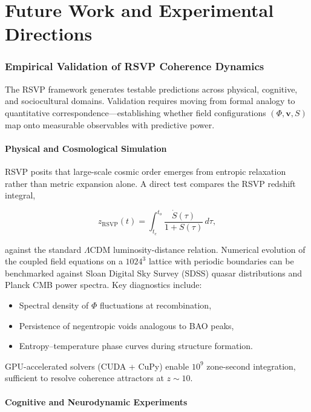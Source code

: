 \documentclass[12pt,a4paper]{article}
\begin{document}
\clearpage
\part*{Future Work and Experimental Directions}

\section{Empirical Validation of RSVP Coherence Dynamics}

The RSVP framework generates testable predictions across physical, cognitive, and sociocultural domains. Validation requires moving from formal analogy to quantitative correspondence—establishing whether field configurations $(\Phi, \bm{v}, S)$ map onto measurable observables with predictive power.

\subsection{Physical and Cosmological Simulation}

RSVP posits that large-scale cosmic order emerges from entropic relaxation rather than metric expansion alone. A direct test compares the RSVP redshift integral,

\begin{equation}
z_{\text{RSVP}}(t) = \int_{t_e}^{t_o} \frac{\dot{S}(\tau)}{1 + S(\tau)} \, d\tau,
\end{equation}

against the standard $\Lambda$CDM luminosity-distance relation. Numerical evolution of the coupled field equations on a $1024^3$ lattice with periodic boundaries can be benchmarked against Sloan Digital Sky Survey (SDSS) quasar distributions and Planck CMB power spectra. Key diagnostics include:
\begin{itemize}
\item Spectral density of $\Phi$ fluctuations at recombination,
\item Persistence of negentropic voids analogous to BAO peaks,
\item Entropy–temperature phase curves during structure formation.
\end{itemize}

GPU-accelerated solvers (CUDA + CuPy) enable $10^9$ zone-second integration, sufficient to resolve coherence attractors at $z \sim 10$.

\subsection{Cognitive and Neurodynamic Experiments}
\end{document}
